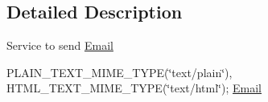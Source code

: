 \subsection{Detailed Description}
Service to send \hyperlink{classcom_1_1shephertz_1_1app42_1_1paas_1_1sdk_1_1windows_1_1email_1_1_email}{Email} 

P\+L\+A\+I\+N\+\_\+\+T\+E\+X\+T\+\_\+\+M\+I\+M\+E\+\_\+\+T\+Y\+P\+E(\char`\"{}text/plain\char`\"{}), H\+T\+M\+L\+\_\+\+T\+E\+X\+T\+\_\+\+M\+I\+M\+E\+\_\+\+T\+Y\+P\+E(\char`\"{}text/html\char`\"{}); \hyperlink{classcom_1_1shephertz_1_1app42_1_1paas_1_1sdk_1_1windows_1_1email_1_1_email_service}{Email} 